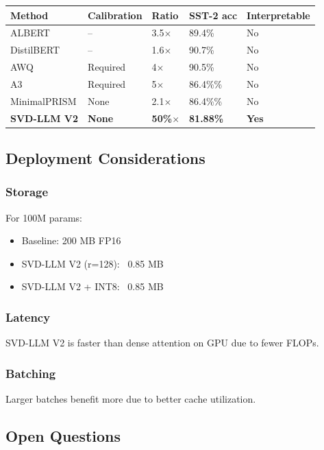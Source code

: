\begin{table}[H]
\centering
\small
\begin{tabular}{lllll}
\toprule
\textbf{Method} & \textbf{Calibration} & \textbf{Ratio} & \textbf{SST-2 acc} & \textbf{Interpretable} \\
\midrule
ALBERT & -- & 3.5$\times$ & 89.4\% & No \\
DistilBERT & -- & 1.6$\times$ & 90.7\% & No \\
AWQ & Required & 4$\times$ & 90.5\% & No \\
A3 & Required & 5$\times$ & 86.4\%\% & No \\
MinimalPRISM & None & 2.1$\times$ & 86.4\%\% & No \\
\textbf{SVD-LLM V2} & \textbf{None} & \textbf{50\%$\times$} & \textbf{81.88\%} & \textbf{Yes} \\
\bottomrule
\end{tabular}
\end{table}

\subsection{Deployment Considerations}

\subsubsection{Storage}
For 100M params:
\begin{itemize}
\item Baseline: 200 MB FP16
\item SVD-LLM V2 (r=128): ~0.85 MB
\item SVD-LLM V2 + INT8: ~0.85 MB

\end{itemize}
\subsubsection{Latency}
SVD-LLM V2 is faster than dense attention on GPU due to fewer FLOPs.

\subsubsection{Batching}
Larger batches benefit more due to better cache utilization.

\subsection{Open Questions}

